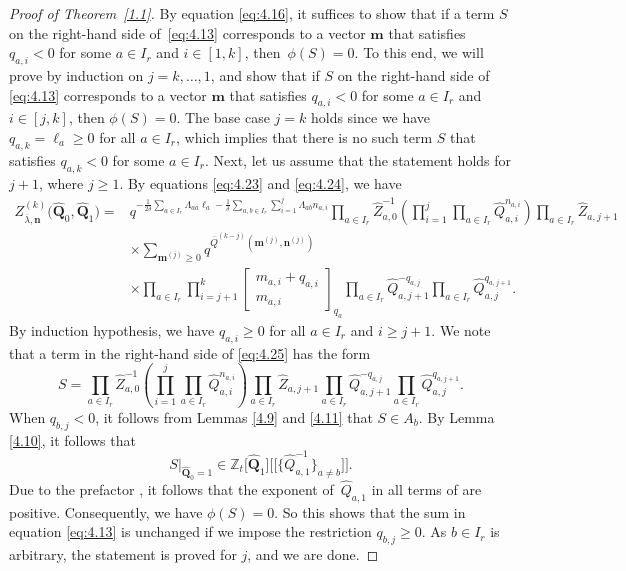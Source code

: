 \documentclass[10pt,a4paper]{amsart}
\numberwithin{equation}{section}
\begin{document}
\begin{proof}[Proof of Theorem~\ref{1.1}]
By equation \eqref{eq:4.16}, it suffices to show that if a term $S$ on the right-hand side of~\eqref{eq:4.13} corresponds to a vector $\mathbf{m}$ that satisfies $q_{a,i}<0$ for some $a\in I_r$ and $i\in[1,k]$, then~${\phi(S)=0}$. To this end, we will prove by induction on $j=k,\dots,1$, and show that if $S$ on the right-hand side of \eqref{eq:4.13} corresponds to a vector $\mathbf{m}$ that satisfies $q_{a,i}<0$ for some $a\in I_r$ and~${i\in[j,k]}$, then $\phi(S)=0$. The base case $j=k$ holds since we have $q_{a,k}=\ell_a\geq0$ for all $a\in I_r$, which implies that there is no such term $S$ that satisfies $q_{a,k}<0$ for some $a\in I_r$. Next, let us assume that the statement holds for $j+1$, where $j\geq1$. By equations \eqref{eq:4.23} and \eqref{eq:4.24}, we have
\begin{align}\label{eq:4.25}
Z_{\overline{\lambda},\mathbf{n}}^{(k)}\bigl(\widehat{\mathbf{Q}}_0,\widehat{\mathbf{Q}}_1\bigr)
={}&q^{-\frac{1}{2\delta}\sum_{a\in I_r}\Lambda_{aa}\ell_a-\frac{1}{\delta}\sum_{a,b\in I_r}\sum_{i=1}^j\Lambda_{ab}n_{a,i}}\prod_{a\in I_r}\widehat{Z}_{a,0}^{-1}\left(\prod_{i=1}^j\prod_{a\in I_r}\widehat{Q}_{a,i}^{n_{a,i}}\right)\prod_{a\in I_r}\widehat{Z}_{a,j+1}\nonumber\\
&\times\sum_{\mathbf{m}^{(j)}\geq0}q^{\overline{Q}^{(k-j)}(\mathbf{m}^{(j)},\mathbf{n}^{(j)})}\nonumber\\
&\times\prod_{a\in I_r}\prod_{i=j+1}^k\begin{bmatrix}m_{a,i}+q_{a,i}\\m_{a,i}\end{bmatrix}_{q_a}\prod_{a\in I_r}\widehat{Q}_{a,j+1}^{-q_{a,j}}\prod_{a\in I_r}\widehat{Q}_{a,j}^{q_{a,j+1}}.
\end{align}
By induction hypothesis, we have $q_{a,i}\geq0$ for all $a\in I_r$ and $i\geq j+1$. We note that a term in the right-hand side of \eqref{eq:4.25} has the form
\begin{equation*}
S
=\prod_{a\in I_r}\widehat{Z}_{a,0}^{-1}\left(\prod_{i=1}^j\prod_{a\in I_r}\widehat{Q}_{a,i}^{n_{a,i}}\right)\prod_{a\in I_r}\widehat{Z}_{a,j+1}\prod_{a\in I_r}\widehat{Q}_{a,j+1}^{-q_{a,j}}\prod_{a\in I_r}\widehat{Q}_{a,j}^{q_{a,j+1}}.
\end{equation*}
When $q_{b,j}<0$, it follows from Lemmas \ref{4.9} and \ref{4.11} that $S\in A_b$. By Lemma \ref{4.10}, it follows that
\[
S|_{\widehat{\mathbf{Q}}_0=1}\in\mathbb{Z}_t\bigl[\widehat{\mathbf{Q}}_1\bigr]\bigl[\bigl[\bigl\{\widehat{Q}_{a,1}^{-1}\bigr\}_{a\neq b}\bigr]\bigr].
\]
 Due to the prefactor , it follows that the exponent of~$\widehat{Q}_{a,1}$ in all terms of  are positive. Consequently, we have $\phi(S)=0$. So this shows that the sum in equation \eqref{eq:4.13} is unchanged if we impose the restriction $q_{b,j}\geq0$. As $b\in I_r$ is arbitrary, the statement is proved for $j$, and we are done.
\end{proof}
\end{document}

